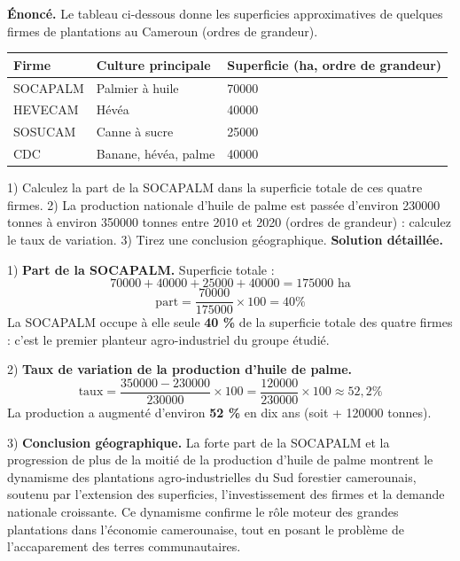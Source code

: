 \documentclass[11pt]{article}
\begin{document}
\begin{exoresolu}
\textbf{Énoncé.} Le tableau ci-dessous donne les superficies approximatives de quelques firmes de plantations au Cameroun (ordres de grandeur).

\begin{center}
\begin{tabularx}{\linewidth}{|l|X|X|}\hline
\rowcolor{popblueL} \textbf{Firme} & \textbf{Culture principale} & \textbf{Superficie (ha, ordre de grandeur)} \\ \hline
SOCAPALM & Palmier à huile & \num{70000} \\ \hline
HEVECAM & Hévéa & \num{40000} \\ \hline
SOSUCAM & Canne à sucre & \num{25000} \\ \hline
CDC & Banane, hévéa, palme & \num{40000} \\ \hline
\end{tabularx}
\end{center}

1) Calculez la part de la SOCAPALM dans la superficie totale de ces quatre firmes. 2) La production nationale d'huile de palme est passée d'environ \num{230000} tonnes à environ \num{350000} tonnes entre 2010 et 2020 (ordres de grandeur) : calculez le taux de variation. 3) Tirez une conclusion géographique.
\tcblower
\textbf{Solution détaillée.}

1) \textbf{Part de la SOCAPALM.} Superficie totale :
\[ \num{70000} + \num{40000} + \num{25000} + \num{40000} = \num{175000} \text{ ha} \]
\[ \text{part} = \frac{\num{70000}}{\num{175000}} \times 100 = 40 \% \]
La SOCAPALM occupe à elle seule \textbf{40 \%} de la superficie totale des quatre firmes : c'est le premier planteur agro-industriel du groupe étudié.

2) \textbf{Taux de variation de la production d'huile de palme.}
\[ \text{taux} = \frac{\num{350000} - \num{230000}}{\num{230000}} \times 100 = \frac{\num{120000}}{\num{230000}} \times 100 \approx 52,2 \% \]
La production a augmenté d'environ \textbf{52 \%} en dix ans (soit + \num{120000} tonnes).

3) \textbf{Conclusion géographique.} La forte part de la SOCAPALM et la progression de plus de la moitié de la production d'huile de palme montrent le dynamisme des plantations agro-industrielles du Sud forestier camerounais, soutenu par l'extension des superficies, l'investissement des firmes et la demande nationale croissante. Ce dynamisme confirme le rôle moteur des grandes plantations dans l'économie camerounaise, tout en posant le problème de l'accaparement des terres communautaires.
\end{exoresolu}
\end{document}
